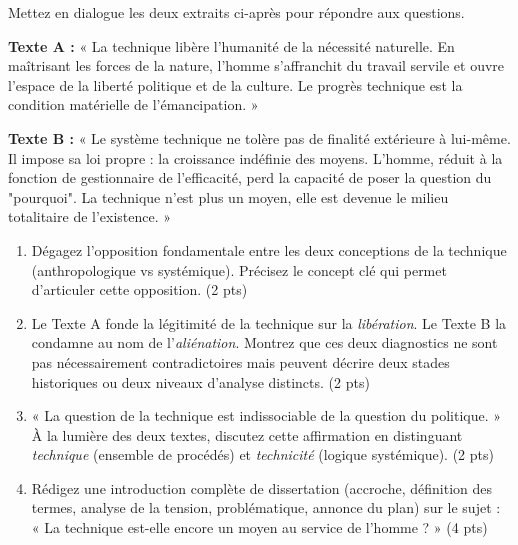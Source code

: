 \documentclass[11pt]{article}
\begin{document}
\begin{exercice}
Mettez en dialogue les deux extraits ci-après pour répondre aux questions.

\textbf{Texte A :} « La technique libère l'humanité de la nécessité naturelle. En maîtrisant les forces de la nature, l'homme s'affranchit du travail servile et ouvre l'espace de la liberté politique et de la culture. Le progrès technique est la condition matérielle de l'émancipation. »

\textbf{Texte B :} « Le système technique ne tolère pas de finalité extérieure à lui-même. Il impose sa loi propre : la croissance indéfinie des moyens. L'homme, réduit à la fonction de gestionnaire de l'efficacité, perd la capacité de poser la question du "pourquoi". La technique n'est plus un moyen, elle est devenue le milieu totalitaire de l'existence. »

\begin{enumerate}
    \item Dégagez l'opposition fondamentale entre les deux conceptions de la technique (anthropologique vs systémique). Précisez le concept clé qui permet d'articuler cette opposition. (2 pts)
    \item Le Texte A fonde la légitimité de la technique sur la \textit{libération}. Le Texte B la condamne au nom de l'\textit{aliénation}. Montrez que ces deux diagnostics ne sont pas nécessairement contradictoires mais peuvent décrire deux stades historiques ou deux niveaux d'analyse distincts. (2 pts)
    \item « La question de la technique est indissociable de la question du politique. » À la lumière des deux textes, discutez cette affirmation en distinguant \textit{technique} (ensemble de procédés) et \textit{technicité} (logique systémique). (2 pts)
    \item Rédigez une introduction complète de dissertation (accroche, définition des termes, analyse de la tension, problématique, annonce du plan) sur le sujet : « La technique est-elle encore un moyen au service de l'homme ? » (4 pts)
\end{enumerate}
\end{exercice}
\end{document}

